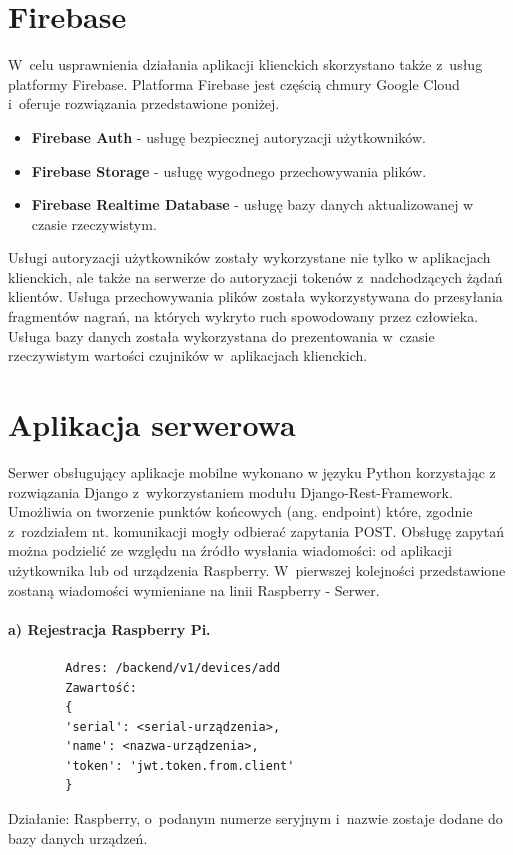 \documentclass[polish,bachelor,a4paper,oneside]{ppfcmthesis}
\begin{document}
    \section{Firebase}

    W~celu usprawnienia działania aplikacji klienckich skorzystano także z~usług platformy Firebase. Platforma Firebase jest częścią chmury Google Cloud i~oferuje rozwiązania przedstawione poniżej.
    \begin{itemize}
        \item \textbf{Firebase Auth} - usługę bezpiecznej autoryzacji użytkowników.
        \item \textbf{Firebase Storage} - usługę wygodnego przechowywania plików.
        \item \textbf{Firebase Realtime Database} - usługę bazy danych aktualizowanej w czasie rzeczywistym.
    \end{itemize}

    Usługi autoryzacji użytkowników zostały wykorzystane nie tylko w aplikacjach klienckich, ale także na serwerze do autoryzacji tokenów z~nadchodzących żądań klientów. Usługa przechowywania plików została wykorzystywana do przesyłania fragmentów nagrań, na których wykryto ruch spowodowany przez człowieka. Usługa bazy danych została wykorzystana do prezentowania w~czasie rzeczywistym wartości czujników w~aplikacjach klienckich.


    \section{Aplikacja serwerowa}

    Serwer obsługujący aplikacje mobilne wykonano w języku Python korzystając z rozwiązania Django z~wykorzystaniem modułu Django-Rest-Framework. Umożliwia on tworzenie punktów końcowych (ang. endpoint) które, zgodnie z~rozdziałem nt. komunikacji mogły odbierać zapytania POST.
    Obsługę zapytań można podzielić ze względu na źródło wysłania wiadomości: od aplikacji użytkownika lub od urządzenia Raspberry.
    W~pierwszej kolejności przedstawione zostaną wiadomości wymieniane na linii Raspberry - Serwer.
    \paragraph{a) Rejestracja Raspberry Pi.}
    \begin{verbatim}
        Adres: /backend/v1/devices/add
        Zawartość:
        {
        'serial': <serial-urządzenia>,
        'name': <nazwa-urządzenia>,
        'token': 'jwt.token.from.client'
        }
    \end{verbatim}
    Działanie: Raspberry, o~podanym numerze seryjnym i~nazwie zostaje dodane do bazy danych urządzeń.
\end{document}

